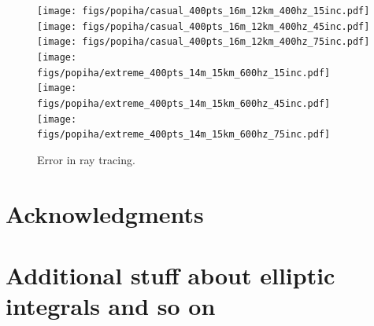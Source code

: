\documentclass[iop, usenatbib]{emulateapj}
\begin{document}
\begin{figure}
\centering
\texttt{[image: figs/popiha/casual\_400pts\_16m\_12km\_400hz\_15inc.pdf]}
\texttt{[image: figs/popiha/casual\_400pts\_16m\_12km\_400hz\_45inc.pdf]}
\texttt{[image: figs/popiha/casual\_400pts\_16m\_12km\_400hz\_75inc.pdf]}
\texttt{[image: figs/popiha/extreme\_400pts\_14m\_15km\_600hz\_15inc.pdf]}
\texttt{[image: figs/popiha/extreme\_400pts\_14m\_15km\_600hz\_45inc.pdf]}
\texttt{[image: figs/popiha/extreme\_400pts\_14m\_15km\_600hz\_75inc.pdf]}
\caption{\label{fig:H_C1_C2}
  Error in ray tracing.
  }
\end{figure}







\section*{Acknowledgments}






\clearpage
\appendix

\section{Additional stuff about elliptic integrals and so on}
\end{document}
